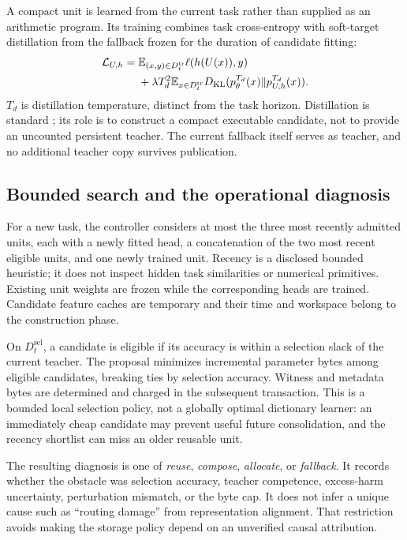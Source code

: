 \documentclass{article}
\begin{document}
A compact unit is learned from the current task rather than supplied as an arithmetic program. Its training combines task cross-entropy with soft-target distillation from the fallback frozen for the duration of candidate fitting:
\begin{equation}
\begin{aligned}
\mathcal{L}_{U,h}={}&\mathbb{E}_{(x,y)\in D_t^{\mathrm{tr}}}\ell(h(U(x)),y)\\
&+\lambda T_d^2\mathbb{E}_{x\in D_t^{\mathrm{tr}}}
 D_{\mathrm{KL}}(p_\theta^{T_d}(x)\Vert p_{U,h}^{T_d}(x)).
\end{aligned}
\label{eq:distill}
\end{equation}
$T_d$ is distillation temperature, distinct from the task horizon. Distillation is standard \cite{hinton2015}; its role is to construct a compact executable candidate, not to provide an uncounted persistent teacher. The current fallback itself serves as teacher, and no additional teacher copy survives publication.

\subsection{Bounded search and the operational diagnosis}
For a new task, the controller considers at most the three most recently admitted units, each with a newly fitted head, a concatenation of the two most recent eligible units, and one newly trained unit. Recency is a disclosed bounded heuristic; it does not inspect hidden task similarities or numerical primitives. Existing unit weights are frozen while the corresponding heads are trained. Candidate feature caches are temporary and their time and workspace belong to the construction phase.

On $D_t^{\mathrm{sel}}$, a candidate is eligible if its accuracy is within a selection slack of the current teacher. The proposal minimizes incremental parameter bytes among eligible candidates, breaking ties by selection accuracy. Witness and metadata bytes are determined and charged in the subsequent transaction. This is a bounded local selection policy, not a globally optimal dictionary learner: an immediately cheap candidate may prevent useful future consolidation, and the recency shortlist can miss an older reusable unit.

The resulting diagnosis is one of \emph{reuse}, \emph{compose}, \emph{allocate}, or \emph{fallback}. It records whether the obstacle was selection accuracy, teacher competence, excess-harm uncertainty, perturbation mismatch, or the byte cap. It does not infer a unique cause such as ``routing damage'' from representation alignment. That restriction avoids making the storage policy depend on an unverified causal attribution.
\end{document}
